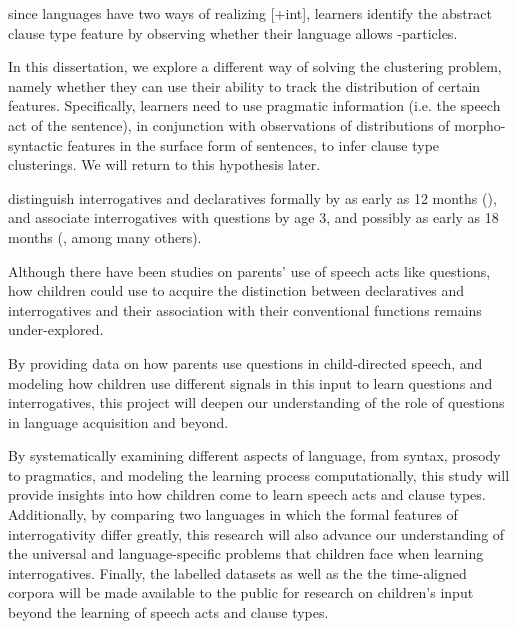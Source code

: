 since languages have two ways of realizing [+int], learners identify the abstract clause type feature by observing whether their language allows \twh-particles. 


In this dissertation, we explore a different way of solving the clustering problem, namely whether they can use their ability to track the distribution of certain features. Specifically, learners need to use pragmatic information (i.e. the speech act of the sentence), in conjunction with observations of distributions of morpho-syntactic features in the surface form of sentences, to infer clause type clusterings. We will return to this hypothesis later. 



distinguish interrogatives and declaratives formally by as early as 12 months (\cite{geffenmintz2015wordorder}), and associate interrogatives with questions by age 3, and possibly as early as 18 months (\citealt{tyack1977, ervintripp1978, berningergarvey1981, rowland2003cdswh, seidl2003wh, casillas2013,casillas2017turn, clark2015turn, lammertink2015turn, gagliardi2016wh, perkins2020filler}, among many others). 

Although there have been studies on parents' use of speech acts like questions, how children could use to acquire the distinction between declaratives and interrogatives and their association with their conventional functions remains under-explored. 
 
 By providing data on how parents use questions in child-directed speech, and modeling how children use different signals in this input to learn questions and interrogatives, this project will deepen our understanding of the role of questions in language acquisition and beyond. 

By systematically examining different aspects of language, from syntax, prosody to pragmatics, and modeling the learning process computationally, this study will provide insights into how children come to learn speech acts and clause types. Additionally, by comparing two languages in which the formal features of interrogativity differ greatly, this research will also advance our understanding of the universal and language-specific problems that children face when learning interrogatives. Finally, the labelled datasets as well as the the time-aligned corpora will be made available to the public for research on children's input beyond the learning of speech acts and clause types. 


